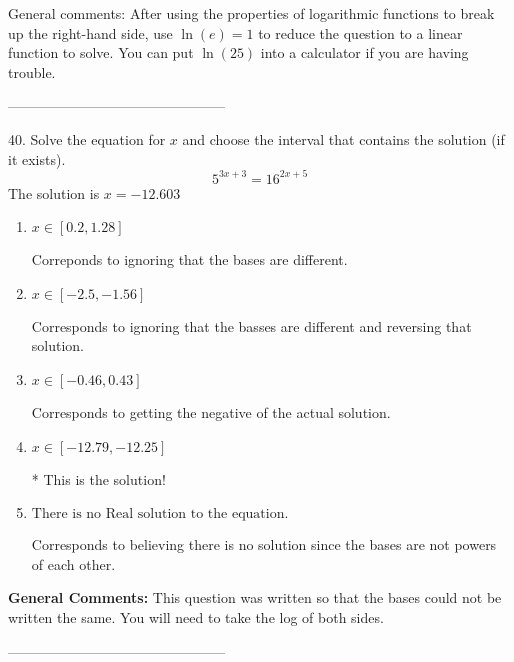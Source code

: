 \documentclass{article}[10pt]
\begin{document}
General comments: After using the properties of logarithmic functions to break up the right-hand side, use $\ln(e) = 1$ to reduce the question to a linear function to solve. You can put $\ln(25)$ into a calculator if you are having trouble.

-----------------------------------------------

40. Solve the equation for $x$ and choose the interval that contains the solution (if it exists).
$$ 5^{3x+3} = 16^{2x+5} $$ 
The solution is $ x = -12.603 $ 

\begin{enumerate}[label=\Alph*.] 
\item $ x \in [0.2, 1.28] $ 

  Correponds to ignoring that the bases are different. 
\item $ x \in [-2.5, -1.56] $ 

  Corresponds to ignoring that the basses are different and reversing that solution. 
\item $ x \in [-0.46, 0.43] $ 

  Corresponds to getting the negative of the actual solution. 
\item $ x \in [-12.79, -12.25] $ 

 * This is the solution! 
\item $ \text{There is no Real solution to the equation.} $ 

  Corresponds to believing there is no solution since the bases are not powers of each other. 
\end{enumerate} 
 
\textbf{General Comments:} This question was written so that the bases could not be written the same. You will need to take the log of both sides.

-----------------------------------------------
\end{document}
